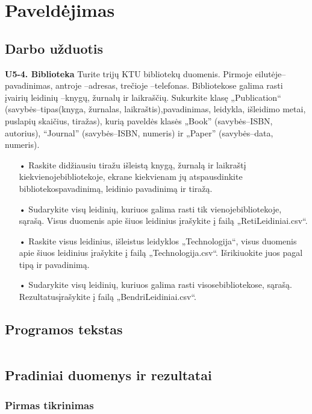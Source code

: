 \documentclass{article}
\begin{document}
\section{Paveldėjimas}
\subsection{Darbo užduotis}
\textbf{U5-4. Biblioteka}\newline
Turite trijų KTU bibliotekų duomenis. Pirmoje eilutėje–pavadinimas, antroje –adresas, trečioje –telefonas.  Bibliotekose galima rasti įvairių leidinių –knygų, žurnalų ir  laikraščių. Sukurkite klasę „Publication“ (savybės–tipas(knyga, žurnalas, laikraštis),pavadinimas, leidykla, išleidimo metai, puslapių skaičius, tiražas), kurią paveldės klasės „Book” (savybės–ISBN, autorius), “Journal” (savybės–ISBN, numeris) ir „Paper” (savybės–data, numeris).
\begin{itemize}
    \item[•]Raskite  didžiausiu  tiražu  išleistą  knygą,  žurnalą  ir  laikraštį  kiekvienojebibliotekoje,   ekrane kiekvienam jų atspausdinkite bibliotekospavadinimą, leidinio pavadinimą ir tiražą.
    \item[•]Sudarykite visų leidinių, kuriuos  galima  rasti  tik  vienojebibliotekoje, sąrašą. Visus duomenis apie šiuos leidinius įrašykite į failą „RetiLeidiniai.csv“.
    \item[•]Raskite visus leidinius, išleistus leidyklos „Technologija“, visus duomenis apie šiuos leidinius įrašykite į failą „Technologija.csv“. Išrikiuokite juos pagal tipą ir pavadinimą.
    \item[•]Sudarykite visų leidinių, kuriuos galima rasti visosebibliotekose, sąrašą. Rezultatusįrašykite į failą „BendriLeidiniai.csv“.
\end{itemize}


\subsection{Programos tekstas}
\inputminted{csharp}{Assets/L5/L5-rawtext.txt}

\subsection{Pradiniai duomenys ir rezultatai}
\subsubsection{Pirmas tikrinimas}
\end{document}
